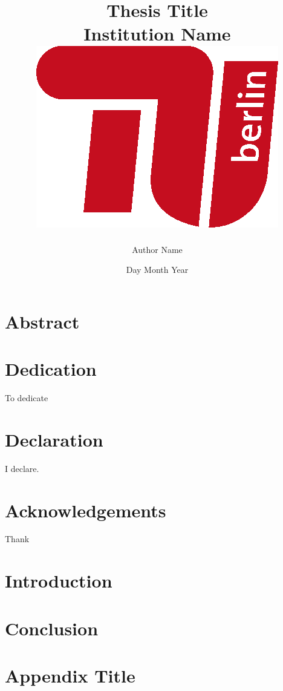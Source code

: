 \documentclass[a4paper,12pt]{report}
\title{
	{Thesis Title}\\
	{\large Institution Name}\\
	{\includegraphics{tu_logo.png}}
}
\author{Author Name}
\date{Day Month Year}
\begin{document}
\maketitle

\chapter*{Abstract}


\chapter*{Dedication}
To dedicate

\chapter*{Declaration}
I declare.

\chapter*{Acknowledgements}
Thank

\tableofcontents
\listoffigures
\listoftables

\chapter{Introduction}


\chapter{Conclusion}


\appendix

\chapter{Appendix Title}


\printbibliography
\end{document}
